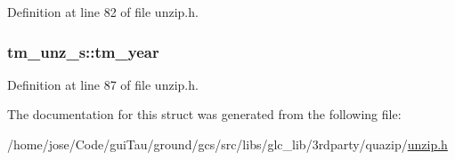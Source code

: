 Definition at line 82 of file unzip.\-h.

\hypertarget{structtm__unz__s_a5f17147e3cfbbfdbeb2e29cbc1df8136}{
\subsubsection[{tm\-\_\-year}]{ tm\-\_\-unz\-\_\-s\-::tm\-\_\-year}}\label{structtm__unz__s_a5f17147e3cfbbfdbeb2e29cbc1df8136}


Definition at line 87 of file unzip.\-h.



The documentation for this struct was generated from the following file\-:\begin{DoxyCompactItemize}
\item 
/home/jose/\-Code/gui\-Tau/ground/gcs/src/libs/glc\-\_\-lib/3rdparty/quazip/\hyperlink{unzip_8h}{unzip.\-h}\end{DoxyCompactItemize}
